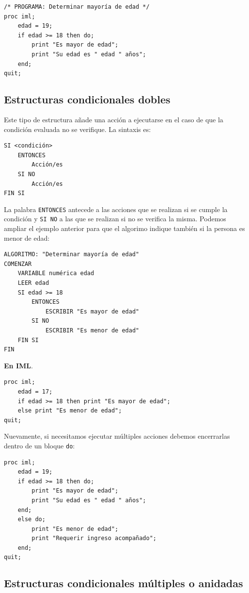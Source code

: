 \documentclass[]{book}
\begin{document}
\begin{verbatim}
/* PROGRAMA: Determinar mayoría de edad */
proc iml;
    edad = 19;
    if edad >= 18 then do;
        print "Es mayor de edad";
        print "Su edad es " edad " años";
    end;
quit;
\end{verbatim}

\subsection{Estructuras condicionales
dobles}\label{estructuras-condicionales-dobles}

Este tipo de estructura añade una acción a ejecutarse en el caso de que
la condición evaluada no se verifique. La sintaxis es:

\begin{verbatim}
SI <condición> 
    ENTONCES
        Acción/es
    SI NO
        Acción/es
FIN SI
\end{verbatim}

La palabra \texttt{ENTONCES} antecede a las acciones que se realizan si
se cumple la condición y \texttt{SI\ NO} a las que se realizan si no se
verifica la misma. Podemos ampliar el ejemplo anterior para que el
algorimo indique también si la persona es menor de edad:

\begin{verbatim}
ALGORITMO: "Determinar mayoría de edad"
COMENZAR
    VARIABLE numérica edad
    LEER edad
    SI edad >= 18 
        ENTONCES
            ESCRIBIR "Es mayor de edad"
        SI NO
            ESCRIBIR "Es menor de edad"
    FIN SI
FIN
\end{verbatim}

\textbf{En IML}.

\begin{verbatim}
proc iml;
    edad = 17;
    if edad >= 18 then print "Es mayor de edad";
    else print "Es menor de edad";
quit;
\end{verbatim}

Nuevamente, si necesitamos ejecutar múltiples acciones debemos
encerrarlas dentro de un bloque \texttt{do}:

\begin{verbatim}
proc iml;
    edad = 19;
    if edad >= 18 then do;
        print "Es mayor de edad";
        print "Su edad es " edad " años";
    end;
    else do;
        print "Es menor de edad";
        print "Requerir ingreso acompañado";
    end;
quit;
\end{verbatim}

\subsection{Estructuras condicionales múltiples o
anidadas}\label{estructuras-condicionales-multiples-o-anidadas}
\end{document}
